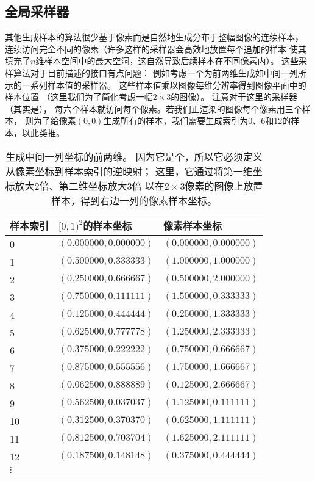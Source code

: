\subsection{全局采样器}\label{sub:全局采样器}
其他生成样本的算法很少基于像素而是自然地生成分布于整幅图像的连续样本，
连续访问完全不同的像素（许多这样的采样器会高效地放置每个追加的样本
使其填充了$n$维样本空间中的最大空洞，这自然导致后续样本在不同像素内）。
这些采样算法对于目前描述的接口有点问题：
例如考虑一个为前两维生成如中间一列所示的一系列样本值的采样器。
这些样本值乘以图像每维分辨率得到图像平面中的样本位置
（这里我们为了简化考虑一幅$2\times3$的图像）。
注意对于这里的采样器（其实是），
每六个样本就访问每个像素。若我们正渲染的图像每个像素用三个样本，
则为了给像素$(0,0)$生成所有的样本，我们需要生成索引为0、6和12的样本，以此类推。
\begin{table}[htb]
    \centering
    \begin{tabular}{lll}
        \toprule
        样本索引 & $[0,1)^2$的样本坐标   & 像素样本坐标          \\
        \midrule
        0        & $(0.000000,0.000000)$ & $(0.000000,0.000000)$ \\
        1        & $(0.500000,0.333333)$ & $(1.000000,1.000000)$ \\
        2        & $(0.250000,0.666667)$ & $(0.500000,2.000000)$ \\
        3        & $(0.750000,0.111111)$ & $(1.500000,0.333333)$ \\
        4        & $(0.125000,0.444444)$ & $(0.250000,1.333333)$ \\
        5        & $(0.625000,0.777778)$ & $(1.250000,2.333333)$ \\
        6        & $(0.375000,0.222222)$ & $(0.750000,0.666667)$ \\
        7        & $(0.875000,0.555556)$ & $(1.750000,1.666667)$ \\
        8        & $(0.062500,0.888889)$ & $(0.125000,2.666667)$ \\
        9        & $(0.562500,0.037037)$ & $(1.125000,0.111111)$ \\
        10       & $(0.312500,0.370370)$ & $(0.625000,1.111111)$ \\
        11       & $(0.812500,0.703704)$ & $(1.625000,2.111111)$ \\
        12       & $(0.187500,0.148148)$ & $(0.375000,0.444444)$ \\
        $\vdots$ &                       &                       \\
        \bottomrule
    \end{tabular}
    \caption{生成中间一列坐标的前两维。
        因为它是个，所以它必须定义从像素坐标到样本索引的逆映射；
        这里，它通过将第一维坐标放大2倍、第二维坐标放大3倍
        以在$2\times3$像素的图像上放置样本，得到右边一列的像素样本坐标。}
    \label{tab:7.2}
\end{table}


